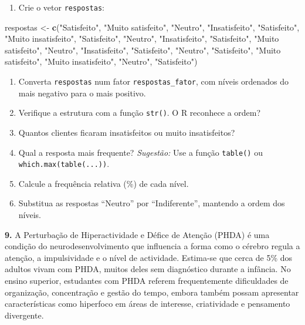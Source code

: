 \documentclass[
  portuguese,
  11pt,
  openany]{book}
\newenvironment{Shaded}{\begin{snugshade}}{\end{snugshade}}
\newcommand{\FunctionTok}[1]{\textcolor[rgb]{0.13,0.29,0.53}{\textbf{#1}}}
\newcommand{\NormalTok}[1]{#1}
\newcommand{\OtherTok}[1]{\textcolor[rgb]{0.56,0.35,0.01}{#1}}
\newcommand{\StringTok}[1]{\textcolor[rgb]{0.31,0.60,0.02}{#1}}
\providecommand{\tightlist}{%
  \setlength{\itemsep}{0pt}\setlength{\parskip}{0pt}}
\begin{document}
\begin{enumerate}
\def\labelenumi{(\alph{enumi})}
\tightlist
\item
  Crie o vetor \texttt{respostas}:
\end{enumerate}

\begin{Shaded}
\begin{Highlighting}[]
\NormalTok{respostas }\OtherTok{\textless{}{-}} \FunctionTok{c}\NormalTok{(}\StringTok{"Satisfeito"}\NormalTok{, }\StringTok{"Muito satisfeito"}\NormalTok{, }\StringTok{"Neutro"}\NormalTok{, }\StringTok{"Insatisfeito"}\NormalTok{, }\StringTok{"Satisfeito"}\NormalTok{,}
  \StringTok{"Muito insatisfeito"}\NormalTok{, }\StringTok{"Satisfeito"}\NormalTok{, }\StringTok{"Neutro"}\NormalTok{, }\StringTok{"Insatisfeito"}\NormalTok{, }\StringTok{"Satisfeito"}\NormalTok{,}
  \StringTok{"Muito satisfeito"}\NormalTok{, }\StringTok{"Neutro"}\NormalTok{, }\StringTok{"Insatisfeito"}\NormalTok{, }\StringTok{"Satisfeito"}\NormalTok{, }\StringTok{"Neutro"}\NormalTok{,}
  \StringTok{"Satisfeito"}\NormalTok{, }\StringTok{"Muito satisfeito"}\NormalTok{, }\StringTok{"Muito insatisfeito"}\NormalTok{, }\StringTok{"Neutro"}\NormalTok{, }\StringTok{"Satisfeito"}\NormalTok{)}
\end{Highlighting}
\end{Shaded}

\begin{enumerate}
\def\labelenumi{(\alph{enumi})}
\setcounter{enumi}{1}
\tightlist
\item
  Converta \texttt{respostas} num fator \texttt{respostas\_fator}, com níveis ordenados do mais
  negativo para o mais positivo.
\item
  Verifique a estrutura com a função \texttt{str()}. O R reconhece a ordem?
\item
  Quantos clientes ficaram insatisfeitos ou muito insatisfeitos?
\item
  Qual a resposta mais frequente?
  \emph{Sugestão:} Use a função \texttt{table()} ou \texttt{which.max(table(...))}.
\item
  Calcule a frequência relativa (\%) de cada nível.
\item
  Substitua as respostas ``Neutro'' por ``Indiferente'', mantendo a ordem dos
  níveis.
\end{enumerate}

\textbf{9.} A Perturbação de Hiperactividade e Défice de Atenção (PHDA) é uma condição do neurodesenvolvimento que influencia a forma como o cérebro regula a atenção, a impulsividade e o nível de actividade. Estima-se que cerca de 5\% dos adultos vivam com PHDA, muitos deles sem diagnóstico durante a infância. No ensino superior, estudantes com PHDA referem frequentemente dificuldades de organização, concentração e gestão do tempo, embora também possam apresentar características como hiperfoco em áreas de interesse, criatividade e pensamento divergente.
\end{document}
